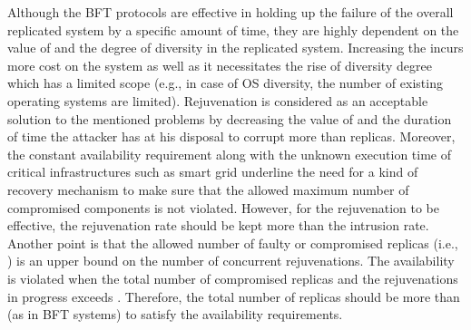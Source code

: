 \documentclass[preprint,number,12pt]{elsarticle}
\begin{document}
Although the BFT protocols are effective in holding up the failure of the overall replicated system by a specific amount of time, they are highly dependent on the value of  and the degree of diversity in the replicated system\citep{Bessani2011a}. Increasing the  incurs more cost on the system as well as it necessitates the rise of diversity degree which has a limited scope (e.g., in case of OS diversity, the number of existing operating systems  are limited). Rejuvenation is considered as an acceptable solution to the mentioned problems by decreasing the value of  and the duration of time the attacker has at his disposal to corrupt more than  replicas. Moreover, the constant availability requirement along with the unknown execution time of critical infrastructures such as smart grid underline the need for a kind of recovery mechanism to make sure that the allowed maximum number of compromised components is not violated. However, for the rejuvenation to be effective, the rejuvenation rate should be kept more than the intrusion rate\citep{Sousa2006}. Another point is that the allowed number of faulty or compromised replicas (i.e., ) is an upper bound on the number of concurrent rejuvenations. The availability is violated when the total number of compromised replicas and the rejuvenations in progress exceeds . Therefore, the total number of replicas should be more than  (as in BFT systems) to satisfy the availability requirements\citep{Sousa2008}.
\end{document}
